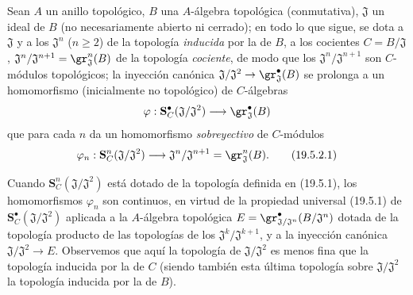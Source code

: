\begin{env}[19.5.2]
\label{0.19.5.2-fr}
Sean $A$ un anillo topológico, $B$ una $A$-álgebra topológica
(conmutativa), $\mathfrak J$ un ideal de $B$ (no necesariamente abierto ni
cerrado); en todo lo que sigue, se dota a $\mathfrak J$ y a los
$\mathfrak J^n$ ($n\geq2$) de la topología \emph{inducida} por la de $B$,
a los cocientes $C=B/\mathfrak J$,
$\mathfrak J^n/\mathfrak J^{n+1}=\gr_{\mathfrak J}^n(B)$ de la topología
\emph{cociente}, de modo que los $\mathfrak J^n/\mathfrak J^{n+1}$ son
$C$-módulos topológicos; la inyección canónica
$\mathfrak J/\mathfrak J^2\to\gr_{\mathfrak J}^\bullet(B)$ se prolonga a un
homomorfismo (inicialmente no topológico) de $C$-álgebras
\[
  \varphi:\mathbf S_C^\bullet(\mathfrak J/\mathfrak J^2)
  \longrightarrow\gr_{\mathfrak J}^\bullet(B)
\]
que para cada $n$ da un homomorfismo \emph{sobreyectivo} de $C$-módulos
\begin{equation}
\label{0.19.5.2.1-fr}
  \varphi_n:\mathbf S_C^n(\mathfrak J/\mathfrak J^2)
  \longrightarrow\mathfrak J^n/\mathfrak J^{n+1}
  =\gr_{\mathfrak J}^n(B).
  \tag{19.5.2.1}
\end{equation}



Cuando $\mathbf S_C^n(\mathfrak J/\mathfrak J^2)$ está dotado de la topología
definida en (19.5.1), los homomorfismos $\varphi_n$ son continuos, en virtud
de la propiedad universal (19.5.1) de
$\mathbf S_C^\bullet(\mathfrak J/\mathfrak J^2)$
 aplicada a la $A$-álgebra
topológica $E=\gr^\bullet_{\mathfrak J/\mathfrak J^n}(B/\mathfrak J^n)$ dotada de la
topología producto de las topologías de los $\mathfrak J^k/\mathfrak J^{k+1}$, y a
la inyección canónica $\mathfrak J/\mathfrak J^2\to E$. Observemos que aquí la
topología de $\mathfrak J/\mathfrak J^2$ es menos fina que la topología
inducida por la de $C$ (siendo también esta última topología sobre
$\mathfrak J/\mathfrak J^2$ la topología inducida por la de $B$).
\end{env}

